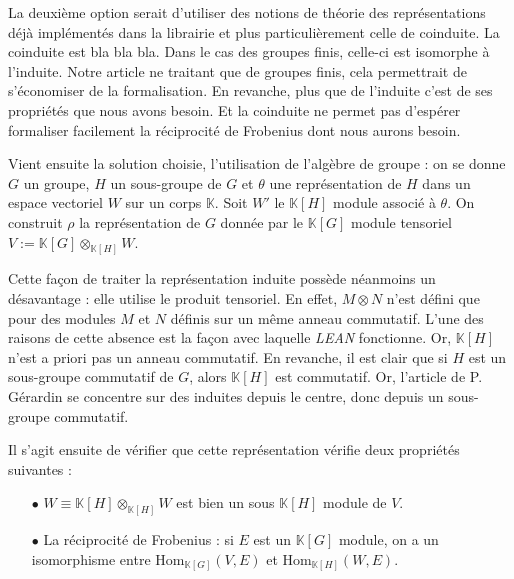 \documentclass[10pt]{article}
\theoremstyle{definition}
\begin{document}
La deuxième option serait d'utiliser des notions de théorie des représentations déjà implémentés dans la librairie et plus particulièrement celle de coinduite. La coinduite est bla bla bla. Dans le cas des groupes finis, celle-ci est isomorphe à l'induite. Notre article ne traitant que de groupes finis, cela permettrait de s'économiser de la formalisation. En revanche, plus que de l'induite c'est de ses propriétés que nous avons besoin. Et la coinduite ne permet pas d'espérer formaliser facilement la réciprocité de Frobenius dont nous aurons besoin.
\newline

Vient ensuite la solution choisie, l'utilisation de l'algèbre de groupe : on se donne $G$ un groupe, $H$ un sous-groupe de $G$ et $\theta$ une représentation de $H$ dans un espace vectoriel $W$ sur un corps $\mathbb{K}$. Soit $W'$ le $\mathbb{K}[H]$ module associé à $\theta$. On construit $\rho$ la représentation de $G$ donnée par le $\mathbb{K}[G]$ module tensoriel $V:=\mathbb{K}[G]\otimes_{\mathbb{K}[H]}W$.
\newline 

Cette façon de traiter la représentation induite possède néanmoins un désavantage : elle utilise le produit tensoriel. En effet, $M\otimes N$ n'est défini que pour des modules $M$ et $N$ définis sur un même anneau commutatif. L'une des raisons de cette absence est la façon avec laquelle \textit{LEAN} fonctionne. 
\newline
Or, $\mathbb{K}[H]$ n'est a priori pas un anneau commutatif. En revanche, il est clair que si $H$ est un sous-groupe commutatif de $G$, alors $\mathbb{K}[H]$ est commutatif. Or, l'article de P. Gérardin se concentre sur des induites depuis le centre, donc depuis un sous-groupe commutatif. 
\newline

 Il s'agit ensuite de vérifier que cette représentation vérifie deux propriétés suivantes : 
 \begin{itemize}
 	\item [$\bullet$] $W\equiv\mathbb{K}[H]\otimes_{\mathbb{K}[H]}W$ est bien un sous $\mathbb{K}[H]$ module de $V$.
 	\item[$\bullet$] La réciprocité de Frobenius : si $E$ est un $\mathbb{K}[G]$ module, on a un isomorphisme entre $\text{Hom}_{\mathbb{K}[G]}(V,E)$ et $\text{Hom}_{\mathbb{K}[H]}(W,E)$.
 \end{itemize}
\end{document}
